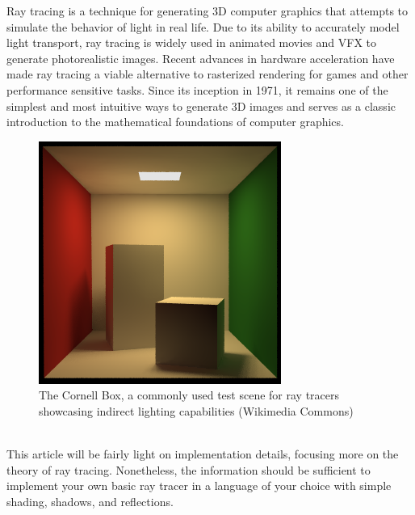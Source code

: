 Ray tracing is a technique for generating 3D computer graphics that attempts to simulate the behavior of light in real life. Due to its ability to accurately model light transport, ray tracing is widely used in animated movies and VFX to generate photorealistic images. Recent advances in hardware acceleration have made ray tracing a viable alternative to rasterized rendering for games and other performance sensitive tasks. Since its inception in 1971, it remains one of the simplest and most intuitive ways to generate 3D images and serves as a classic introduction to the mathematical foundations of computer graphics.
\begin{figure}[h]
    \centering
    \includegraphics[scale=0.7]{figures/Cornell_box.png}
    \caption{The Cornell Box, a commonly used test scene for ray tracers showcasing indirect lighting capabilities (Wikimedia Commons)}
    \label{fig:cornell_box}
\end{figure}
\\
\noindent
This article will be fairly light on implementation details, focusing more on the theory of ray tracing. Nonetheless, the information should be sufficient to implement your own basic ray tracer in a language of your choice with simple shading, shadows, and reflections.